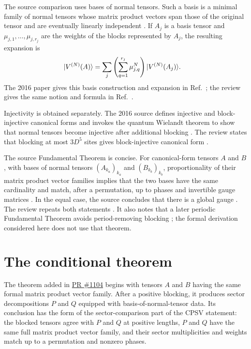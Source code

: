 \documentclass{article}
\begin{document}
The source comparison uses bases of normal tensors. Such a basis is a minimal
family of normal tensors whose matrix product vectors span those of the original
tensor and are eventually linearly independent
\cite[lines~271--280]{Cirac2016MPDO_arXiv}. If $A_j$ is a basis tensor and
$\mu_{j,1},\ldots,\mu_{j,r_j}$ are the weights of the blocks represented by
$A_j$, the resulting expansion is
\begin{align}
    |V^{(N)}(A)\rangle
        &=
        \sum_j
        \left(\sum_{q=1}^{r_j}\mu_{j,q}^{N}\right)
        |V^{(N)}(A_j)\rangle.
    \label{eq:rmp_conditional_after_blocking_ft_statement_bnt_expansion}
\end{align}
The 2016 paper gives this basis construction and expansion in
Ref.~\cite[lines~271--302]{Cirac2016MPDO_arXiv}; the review gives the same
notion and formula in Ref.~\cite[lines~1846--1885]{Cirac2021Matrix}.

Injectivity is obtained separately. The 2016 source defines injective and
block-injective canonical forms and invokes the quantum Wielandt theorem to
show that normal tensors become injective after additional blocking
\cite[lines~317--344]{Cirac2016MPDO_arXiv}. The review states that blocking at
most $3D^5$ sites gives block-injective canonical form
\cite[lines~2114--2124]{Cirac2021Matrix}.

The source Fundamental Theorem is concise. For canonical-form tensors $A$ and
$B$, with bases of normal tensors $(A_{k_a})_{k_a}$ and $(B_{k_b})_{k_b}$,
proportionality of their matrix product vector families implies that the two
bases have the same cardinality and match, after a permutation, up to phases
and invertible gauge matrices
\cite[Theorem~\texttt{thm1}, lines~347--352]{Cirac2016MPDO_arXiv}. In the equal
case, the source concludes that there is a global gauge
\cite[Corollary~\texttt{II\_cor2}, lines~354--360]{Cirac2016MPDO_arXiv}. The
review repeats both statements
\cite[Theorem~\texttt{thm1} and Corollary~\texttt{II\_cor2},
lines~1891--1900]{Cirac2021Matrix}. It also notes that a later periodic
Fundamental Theorem avoids period-removing blocking
\cite[lines~1908--1909]{Cirac2021Matrix}; the formal derivation considered here
does not use that theorem.

\section{The conditional \Lean{} theorem}

The theorem added in
\href{https://github.com/LionSR/TNLean/pull/1104}{PR \#1104} begins with tensors
$A$ and $B$ having the same formal matrix product vector family. After a
positive blocking, it produces sector decompositions $P$ and $Q$ equipped with
basis-of-normal-tensor data. Its conclusion has the form of the
sector-comparison part of the CPSV statement: the blocked tensors agree with
$P$ and $Q$ at positive lengths, $P$ and $Q$ have the same full matrix product
vector family, and their sector multiplicities and weights match up to a
permutation and nonzero phases.
\end{document}
